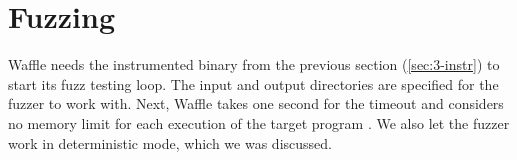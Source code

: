 \section{Fuzzing}

% 

Waffle needs the instrumented binary from the previous section (\ref{sec:3-instr}) to start its fuzz testing loop. The input and output directories are specified for the fuzzer to work with. Next, Waffle takes one second for the timeout and considers no memory limit for each execution of the target program \cite{asan_note}. We also let the fuzzer work in deterministic mode, which we was discussed.


